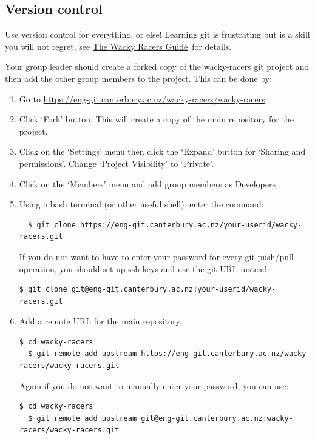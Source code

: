 \documentclass[11pt, a4paper]{article}
\newcommand{\theguide}{\href{https://eng-git.canterbury.ac.nz/wacky-racers/wacky-racers/-/blob/master/doc/guide/guide.pdf}{The Wacky Racers Guide}}
\begin{document}
\subsection{Version control}

Use version control for everything, or else!  Learning git is
frustrating but is a skill you will not regret, see \theguide\ for
details.

Your group leader should create a forked copy of the wacky-racers git project
and then add the other group members to the project.  This can be done by:

\begin{enumerate}
\item Go to \url{https://eng-git.canterbury.ac.nz/wacky-racers/wacky-racers}

\item Click `Fork' button.  This will create a copy of the main repository for the project.

\item Click on the `Settings' menu then click the `Expand' button for
`Sharing and permissions'.  Change `Project Visibility' to `Private'.

\item Click on the `Members' menu and add group members as Developers.

\item Using a bash terminal (or other useful shell), enter the command:

\lstset{language=bash}
\lstset{basicstyle=\ttfamily\small}
\lstset{breaklines}

\begin{lstlisting}
  $ git clone https://eng-git.canterbury.ac.nz/your-userid/wacky-racers.git
\end{lstlisting}

If you do not want to have to enter your password for every git
push/pull operation, you should set up ssh-keys and use the git URL instead:

\begin{lstlisting}[breaklines]
  $ git clone git@eng-git.canterbury.ac.nz:your-userid/wacky-racers.git
\end{lstlisting}

\item Add a remote URL for the main repository.
%
\begin{lstlisting}[breaklines]
  $ cd wacky-racers
  $ git remote add upstream https://eng-git.canterbury.ac.nz/wacky-racers/wacky-racers.git
\end{lstlisting}
%
Again if you do not want to manually enter your password, you can use:
%
\begin{lstlisting}[breaklines]
  $ cd wacky-racers
  $ git remote add upstream git@eng-git.canterbury.ac.nz:wacky-racers/wacky-racers.git
\end{lstlisting}


\end{enumerate}
\end{document}
